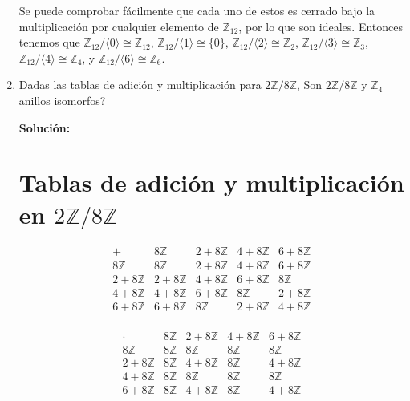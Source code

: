 \begin{enumerate}
Se puede comprobar fácilmente que cada uno de estos es cerrado bajo la multiplicación por cualquier elemento de $\mathbb{Z}_{12}$, por lo que son ideales. Entonces tenemos que $\mathbb{Z}_{12} / \langle 0 \rangle \cong \mathbb{Z}_{12}$, $\mathbb{Z}_{12} / \langle 1 \rangle \cong \{0\}$, $\mathbb{Z}_{12} / \langle 2 \rangle \cong \mathbb{Z}_2$, $\mathbb{Z}_{12} / \langle 3 \rangle \cong \mathbb{Z}_3$, $\mathbb{Z}_{12} / \langle 4 \rangle \cong \mathbb{Z}_4$, y $\mathbb{Z}_{12} / \langle 6 \rangle \cong \mathbb{Z}_6$.

\item Dadas las tablas de adición y multiplicación para $2\mathbb{Z}/8\mathbb{Z}$, Son $2\mathbb{Z}/8\mathbb{Z}$ y $\mathbb{Z}_4$ anillos isomorfos?

\textbf{Solución:}
\section*{Tablas de adición y multiplicación en $2\mathbb{Z}/8\mathbb{Z}$}
\begin{multicols}{2}
\[
\begin{array}{c|cccc}
+ & 8\mathbb{Z} & 2+8\mathbb{Z} & 4+8\mathbb{Z} & 6+8\mathbb{Z} \\
\hline
8\mathbb{Z} & 8\mathbb{Z} & 2+8\mathbb{Z} & 4+8\mathbb{Z} & 6+8\mathbb{Z} \\
2+8\mathbb{Z} & 2+8\mathbb{Z} & 4+8\mathbb{Z} & 6+8\mathbb{Z} & 8\mathbb{Z} \\
4+8\mathbb{Z} & 4+8\mathbb{Z} & 6+8\mathbb{Z} & 8\mathbb{Z} & 2+8\mathbb{Z} \\
6+8\mathbb{Z} & 6+8\mathbb{Z} & 8\mathbb{Z} & 2+8\mathbb{Z} & 4+8\mathbb{Z} \\
\end{array}
\]


\[
\begin{array}{c|cccc}
\cdot & 8\mathbb{Z} & 2+8\mathbb{Z} & 4+8\mathbb{Z} & 6+8\mathbb{Z} \\
\hline
8\mathbb{Z} & 8\mathbb{Z} & 8\mathbb{Z} & 8\mathbb{Z} & 8\mathbb{Z} \\
2+8\mathbb{Z} & 8\mathbb{Z} & 4+8\mathbb{Z} & 8\mathbb{Z} & 4+8\mathbb{Z} \\
4+8\mathbb{Z} & 8\mathbb{Z} & 8\mathbb{Z} & 8\mathbb{Z} & 8\mathbb{Z} \\
6+8\mathbb{Z} & 8\mathbb{Z} & 4+8\mathbb{Z} & 8\mathbb{Z} & 4+8\mathbb{Z} \\
\end{array}
\]
\end{multicols}


\end{enumerate}
